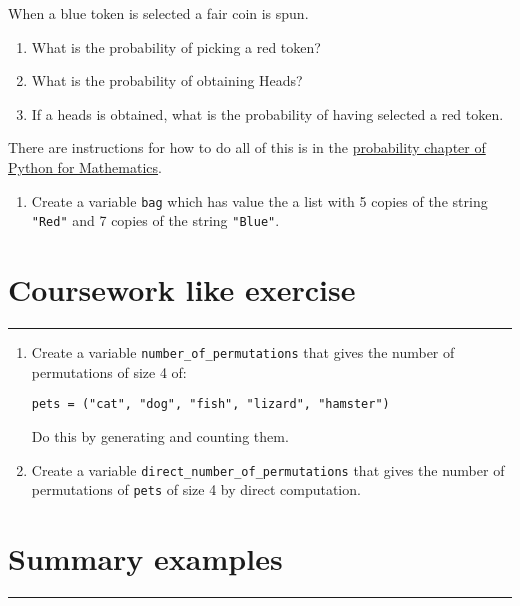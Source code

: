 \documentclass{article}
\begin{document}
When a blue token is selected a fair coin is spun.

\begin{enumerate}
    \item What is the probability of picking a red token?
    \item What is the probability of obtaining Heads?
    \item If a heads is obtained, what is the probability of having selected a red token.
\end{enumerate}

There are instructions for how to do all of this is in the
\href{https://vknight.org/pfm/tools-for-mathematics/06-probability/how/main.html}{probability chapter of Python for Mathematics}.


\begin{enumerate}
    \item Create a variable \texttt{bag} which has value the
        a list with 5 copies of the string \texttt{"Red"} and 7
        copies of the string \texttt{"Blue"}.
\end{enumerate}


\section{Coursework like exercise}
\hrule


\begin{enumerate}
    \item Create a variable \texttt{number_of_permutations} that gives the 
number of permutations of size 4 of:

\texttt{pets = ("cat", "dog", "fish", "lizard", "hamster")}

Do this by generating and counting them.
\item Create a variable \texttt{direct_number_of_permutations} that gives 
    the number of permutations of \texttt{pets} of size 4 by 
        direct computation.
\end{enumerate}

\section{Summary examples}
\hrule
\end{document}

